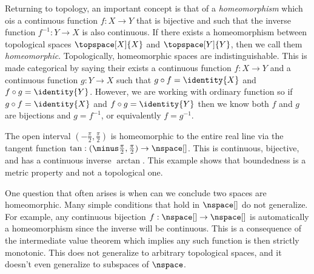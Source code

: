         \par\hfill\par
        Returning to topology, an important concept is that of a
        \textit{homeomorphism} which ois a continuous function
        $f:X\rightarrow{Y}$ that is bijective and such that the inverse
        function $f^{\minus{1}}:Y\rightarrow{X}$ is also continuous.
        If there exists a homeomorphism between topological spaces
        $\topspace[X]{X}$ and $\topspace[Y]{Y}$, then we call them
        \textit{homeomorphic}. Topologically, homeomorphic spaces are
        indistinguishable.
        This is made categorical by saying their exists a continuous
        function $f:X\rightarrow{Y}$ and a continuous function
        $g:Y\rightarrow{X}$ such that $g\circ{f}=\identity{X}$ and
        $f\circ{g}=\identity{Y}$. However, we are working with ordinary
        function so if $g\circ{f}=\identity{X}$ and $f\circ{g}=\identity{Y}$
        then we know both $f$ and $g$ are bijections and
        $g=f^{\minus{1}}$, or equivalently $f=g^{\minus{1}}$.
        \begin{example}
            The open interval $(\minus\frac{\pi}{2},\frac{\pi}{2})$ is
            homeomorphic to the entire real line via the tangent
            function $\tan:(\minus\frac{\pi}{2},\frac{\pi}{2})%
            \rightarrow\nspace[]$. This is continuous, bijective, and
            has a continuous inverse $\arctan$. This example shows that
            boundedness is a metric property and not a topological one.
        \end{example}
        One question that often arises is when can we conclude two
        spaces are homeomorphic. Many simple conditions that hold in
        $\nspace[]$ do not generalize. For example, any continuous
        bijection $f:\nspace[]\rightarrow\nspace[]$ is automatically a
        homeomorphism since the inverse will be continuous. This is a
        consequence of the intermediate value theorem which implies any
        such function is then strictly monotonic. This does not
        generalize to arbitrary topological spaces, and it doesn't even
        generalize to subspaces of $\nspace$.
